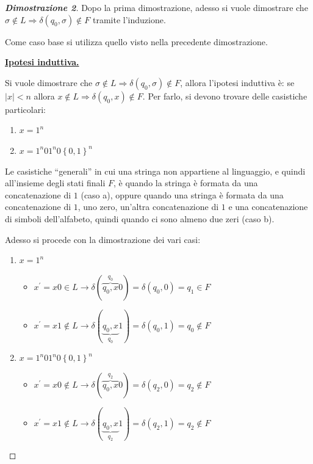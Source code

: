 \documentclass[a4paper]{article}
\newcommand{\dquotes}[1]{``#1''}
\begin{document}
	\begin{proof}[\textcolor{Blue3}{\textbf{Dimostrazione 2}}]
		Dopo la prima dimostrazione, adesso si vuole dimostrare che $\sigma \notin L \Longrightarrow \delta\left(q_{0}, \sigma\right) \notin F$ tramite l'induzione.\newline
		
		\noindent
		Come caso base si utilizza quello visto nella precedente dimostrazione.\newline
		
		\noindent
		\textbf{\underline{Ipotesi induttiva.}}\newline
		
		\noindent
		Si vuole dimostrare che $\sigma \notin L \Longrightarrow \delta\left(q_{0}, \sigma\right) \notin F$, allora l'ipotesi induttiva è: se $|x| < n$ allora $x \notin L \Longrightarrow \delta\left(q_{0}, x\right) \notin F$. Per farlo, si devono trovare delle casistiche particolari:
		
		\begin{enumerate}[label=\alph*.]
			\item $x = 1^{n}$
			
			\item $x = 1^{n} 0 1^{n} 0 \left\{0, 1\right\}^{n}$
		\end{enumerate}
	
		\noindent
		Le casistiche \dquotes{generali} in cui una stringa non appartiene al linguaggio, e quindi all'insieme degli stati finali $F$, è quando la stringa è formata da una concatenazione di $1$ (caso a), oppure quando una stringa è formata da una concatenazione di $1$, uno zero, un'altra concatenazione di $1$ e una concatenazione di simboli dell'alfabeto, quindi quando ci sono almeno due zeri (caso b).\newline
		
		\noindent
		Adesso si procede con la dimostrazione dei vari casi:
		
		\begin{enumerate}[label=\alph*.]
			\item $x = 1^{n}$
				\begin{itemize}
					\item $x^{'} = x0 \in L \longrightarrow \delta(\overbrace{q_{0}, x}^{q_{0}} 0) = \delta\left(q_{0}, 0\right) = q_{1} \in F$
					\item $x^{'} = x1 \notin L \longrightarrow \delta(\underbrace{q_{0}, x}_{q_{0}} 1) = \delta\left(q_{0}, 1\right) = q_{0} \notin F$
				\end{itemize}
			\item $x = 1^{n} 0 1^{n} 0 \left\{0, 1\right\}^{n}$
				\begin{itemize}
					\item $x^{'} = x0 \notin L \longrightarrow \delta(\overbrace{q_{0}, x}^{q_{2}} 0) = \delta\left(q_{2}, 0\right) = q_{2} \notin F$
					\item $x^{'} = x1 \notin L \longrightarrow \delta(\underbrace{q_{0}, x}_{q_{2}} 1) = \delta\left(q_{2}, 1\right) = q_{2} \notin F$
				\end{itemize}
		\end{enumerate}
	\end{proof}
\end{document}
